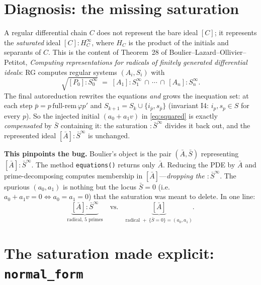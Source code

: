 \documentclass[11pt]{article}
\newcommand{\sat}[2]{[#1]\!:\!#2^{\infty}}
\newcommand{\Sbar}{\bar S}
\newcommand{\code}[1]{\texttt{#1}}
\begin{document}
\section{Diagnosis: the missing saturation}

A regular differential chain $C$ does not represent the bare ideal $[C]$; it
represents the \emph{saturated} ideal $\sat{C}{H_C}$, where
$H_C$ is the product of the initials and separants of $C$. This is the content
of Theorem~28 of Boulier--Lazard--Ollivier--Petitot, \emph{Computing
representations for radicals of finitely generated differential ideals}: RG
computes regular systems $(A_i,S_i)$ with
\begin{equation}
\label{eq:thm28}
   \sqrt{\sat{P_0}{S_0}} \;=\; \sat{A_1}{S_1}\,\cap\,\cdots\,\cap\,\sat{A_n}{S_n}.
\end{equation}
The final autoreduction rewrites the equations \emph{and} grows the inequation
set: at each step $\bar p = p\,\text{full-rem}\,\varphi p'$ and
$S_{k+1}=S_k\cup\{i_{\bar p},s_{\bar p}\}$ (invariant I4: $i_p,s_p\in S$ for every
$p$). So the injected initial $(a_0+a_1v)$ in \eqref{eq:squared} is exactly
\emph{compensated} by $\Sbar$ containing it: the saturation $:\Sbar^\infty$
divides it back out, and the represented ideal $\sat{\bar A}{\Sbar}$ is unchanged.

\medskip
\noindent\textbf{This pinpoints the bug.} Boulier's object is the pair
$(\bar A,\Sbar)$ representing $\sat{\bar A}{\Sbar}$. The method
\code{equations()} returns only $\bar A$. Reducing the PDE by $\bar A$ and
prime-decomposing computes membership in $[\bar A]$---\emph{dropping the
$:\Sbar^\infty$}. The spurious $(a_0,a_1)$ is nothing but the locus
$\Sbar=0$ (i.e.\ $a_0+a_1v=0\iff a_0=a_1=0$) that the saturation was meant to
delete. In one line:
\[
  \underbrace{\sat{\bar A}{\Sbar}}_{\text{radical, 5 primes}}
  \quad\text{vs.}\quad
  \underbrace{[\bar A]}_{\text{radical }+\ \{\Sbar=0\}=(a_0,a_1)}.
\]

\section{The saturation made explicit: \texorpdfstring{\code{normal\_form}}{normal\_form}}
\end{document}
